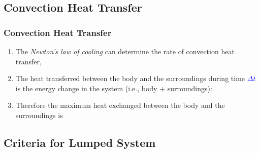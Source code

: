\documentclass[10pt,compress,unknownkeysallowed]{beamer}
\newcommand{\blue}{\textcolor{blue}}
\begin{document}
\subsection{Convection Heat Transfer}

\begin{frame}
 \frametitle{Convection Heat Transfer}
   \begin{enumerate}%
     \item<1-> The {\it Newton's law of cooling} can determine the rate of convection heat transfer,
     \item<2-> The heat transferred between the body and the surroundings during time \blue{$\Delta t$} is the energy change in the system (i.e., body + surroundings):
     \item<3-> Therefore the maximum heat exchanged between the body and the surroundings is
          \visible<3->{\blue{\begin{equation}
              Q_{\text{max}} = m C_{p}\left[T_{0} - T_{\infty}\right] \hspace{1cm} \mathbf{(J)}
          \end{equation}}}
   \end{enumerate}
\end{frame}

\subsection{Criteria for Lumped System}
\end{document}
